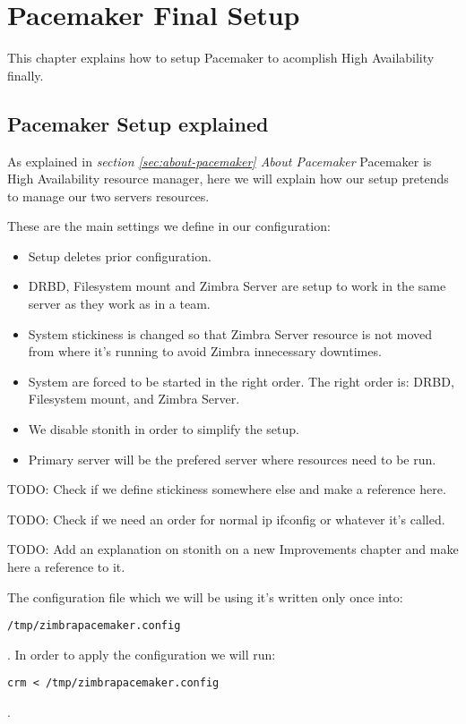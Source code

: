 

\chapter{Pacemaker Final Setup}
This chapter explains how to setup Pacemaker to acomplish High Availability finally.

\section {Pacemaker Setup explained}
As explained in \textit{section \ref{sec:about-pacemaker} About Pacemaker} Pacemaker is High Availability resource manager, here we will explain how our setup pretends to manage our two servers resources.

These are the main settings we define in our configuration:
\begin{itemize}
  \item Setup deletes prior configuration.
  \item DRBD, Filesystem mount and Zimbra Server are setup to work in the same server as they work as in a team.
  \item System stickiness is changed so that Zimbra Server resource is not moved from where it's running to avoid Zimbra innecessary downtimes.
  \item System are forced to be started in the right order. The right order is: DRBD, Filesystem mount, and Zimbra Server.
  \item We disable stonith in order to simplify the setup.
  \item Primary server will be the prefered server where resources need to be run.
\end{itemize}

TODO: Check if we define stickiness somewhere else and make a reference here.

TODO: Check if we need an order for normal ip ifconfig or whatever it's called.

TODO: Add an explanation on stonith on a new Improvements chapter and make here a reference to it.



The configuration file which we will be using it's written only once into:
\begin{verbatim}
/tmp/zimbrapacemaker.config
\end{verbatim}
. In order to apply the configuration we will run:
\begin{verbatim}
crm < /tmp/zimbrapacemaker.config
\end{verbatim}
.


